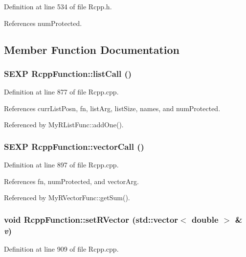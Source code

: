 Definition at line 534 of file Rcpp.h.

References numProtected.

\subsection{Member Function Documentation}
\hypertarget{classRcppFunction_0cc9d29ab7db552494dddefaa78e6578}{
\subsubsection[listCall]{\setlength{\rightskip}{0pt plus 5cm}SEXP RcppFunction::listCall ()}}
\label{classRcppFunction_0cc9d29ab7db552494dddefaa78e6578}




Definition at line 877 of file Rcpp.cpp.

References currListPosn, fn, listArg, listSize, names, and numProtected.

Referenced by MyRListFunc::addOne().\hypertarget{classRcppFunction_c57c514c761609892ff553434e134446}{
\subsubsection[vectorCall]{\setlength{\rightskip}{0pt plus 5cm}SEXP RcppFunction::vectorCall ()}}
\label{classRcppFunction_c57c514c761609892ff553434e134446}




Definition at line 897 of file Rcpp.cpp.

References fn, numProtected, and vectorArg.

Referenced by MyRVectorFunc::getSum().\hypertarget{classRcppFunction_482df5aa5e2a98d52c9a79cf3ab31c67}{
\subsubsection[setRVector]{\setlength{\rightskip}{0pt plus 5cm}void RcppFunction::setRVector (std::vector$<$ double $>$ \& {\em v})}}
\label{classRcppFunction_482df5aa5e2a98d52c9a79cf3ab31c67}




Definition at line 909 of file Rcpp.cpp.

